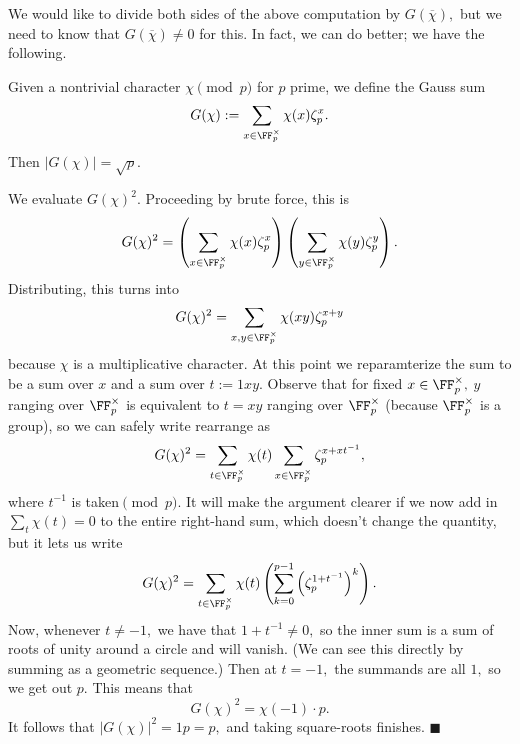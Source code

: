 We would like to divide both sides of the above computation by $G(\overline\chi),$ but we need to know that $G(\overline\chi)\ne0$ for this. In fact, we can do better; we have the following.
\begin{lemma}
    Given a nontrivial character $\chi\pmod p$ for $p$ prime, we define the Gauss sum
    \[G(\chi):=\sum_{x\in\FF_p^\times}\chi(x)\zeta_p^x.\]
    Then $|G(\chi)|=\sqrt p.$
\end{lemma}
We evaluate $G(\chi)^2.$ Proceeding by brute force, this is
\[G(\chi)^2=\left(\sum_{x\in\FF_p^\times}\chi(x)\zeta_p^x\right)\left(\sum_{y\in\FF_p^\times}\chi(y)\zeta_p^y\right).\]
Distributing, this turns into
\[G(\chi)^2=\sum_{x,y\in\FF_p^\times}\chi(xy)\zeta_p^{x+y}\]
because $\chi$ is a multiplicative character. At this point we reparamterize the sum to be a sum over $x$ and a sum over $t:=1xy.$ Observe that for fixed $x\in\FF_p^\times,$ $y$ ranging over $\FF_p^\times$ is equivalent to $t=xy$ ranging over $\FF_p^\times$ (because $\FF_p^\times$ is a group), so we can safely write rearrange as
\[G(\chi)^2=\sum_{t\in\FF_p^\times}\chi(t)\sum_{x\in\FF_p^\times}\zeta_p^{x+xt^{-1}},\]
where $t^{-1}$ is taken$\pmod p.$ It will make the argument clearer if we now add in $\sum_t\chi(t)=0$ to the entire right-hand sum, which doesn't change the quantity, but it lets us write
\[G(\chi)^2=\sum_{t\in\FF_p^\times}\chi(t)\left(\sum_{k=0}^{p-1}\left(\zeta_p^{1+t^{-1}}\right)^k\right).\]
Now, whenever $t\ne-1,$ we have that $1+t^{-1}\ne0,$ so the inner sum is a sum of roots of unity around a circle and will vanish. (We can see this directly by summing as a geometric sequence.) Then at $t=-1,$ the summands are all $1,$ so we get out $p.$ This means that
\[G(\chi)^2=\chi(-1)\cdot p.\]
It follows that $|G(\chi)|^2=1p=p,$ and taking square-roots finishes. $\blacksquare$

